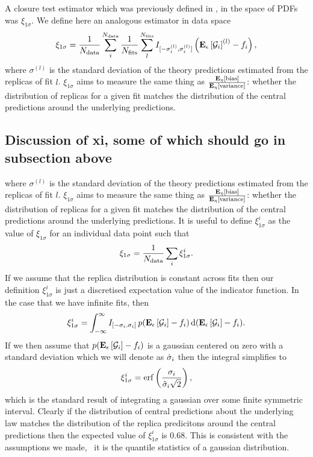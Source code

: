 A closure test estimator which was previously defined in \cite{nnpdf30}, in
the space of PDFs was
$\xi_{1\sigma}$. We define here an analogous estimator in data space
\begin{equation}
    \label{eq:XiDataDef}
    \xi_{1\sigma} = 
        \frac{1}{N_{\rm data}} \sum_{i}^{N_{\rm data}} 
        \frac{1}{N_{\rm fits}} \sum_{l}^{N_{\rm fits}}
            I_{[-\sigma_i^{(l)}, \sigma_i^{(l)}]}
            \left( \mathbf{E}_{\epsilon}\left[ \mathcal{G}_i \right]^{(l)} - f_i \right),
\end{equation}
where $\sigma^{(l)}$ is the standard deviation of the theory predictions
estimated from the replicas of fit $l$. $\xi_{1\sigma}$ aims to measure the same
thing as $\frac{\mathbf{E}_{\eta}\left[ {\rm bias} \right]}{\mathbf{E}_{\eta}\left[ {\rm variance} \right]}$: whether the distribution of
replicas for a given fit matches the distribution of the central predictions
around the underlying predictions.

\subsection{Discussion of xi, some of which should go in subsection above}

where $\sigma^{(l)}$ is the standard deviation of the theory predictions
estimated from the replicas of fit $l$. $\xi_{1\sigma}$ aims to measure the same
thing as $\frac{\mathbf{E}_{\eta}\left[ {\rm bias} \right]}{\mathbf{E}_{\eta}\left[ {\rm variance} \right]}$: whether the distribution of
replicas for a given fit matches the distribution of the central predictions
around the underlying predictions. It is useful to define $\xi_{1\sigma}^{i}$ as
the value of $\xi_{1\sigma}$ for an individual data point such that
\begin{equation}
    \label{eq:XiDataIDel}
    \xi_{1\sigma} = \frac{1}{N_{\rm data}} \sum_i \xi_{1\sigma}^{i}.
\end{equation}
If we assume that the replica distribution is constant across fits then our
definition $\xi_{1\sigma}^{i}$ is just a discretised expectation value of the
indicator function. In the case that we have infinite fits, then
\begin{equation}
    \label{eq:XiIExpecVel}
    \xi_{1\sigma}^{i} = 
    \int_{-\infty}^{\infty} I_{[-\sigma_i, \sigma_i]}\, 
    p(\mathbf{E}_{\epsilon}\left[ \mathcal{G}_i \right] - f_i)\, 
    {\rm d}(\mathbf{E}_{\epsilon}\left[ \mathcal{G}_i \right] - f_i).
\end{equation}
If we then assume that $p(\mathbf{E}_{\epsilon}\left[ \mathcal{G}_i \right] - f_i)$ is a gaussian centered on
zero with a standard deviation which we will denote as $\hat{\sigma}_i$ then the
integral simplifies to
\begin{equation}
    \label{eq:expectedxi}
    \xi_{1\sigma}^{i} = 
    {\rm erf} \left( \frac{\sigma_i}{\hat{\sigma}_i \sqrt{2}}\right),
\end{equation}
which is the standard result of integrating a gaussian over some finite
symmetric interval. Clearly if the distribution of central predictions about the
underlying law matches the distribution of the replica predicitons around the
central predictions then the expected value of $\xi_{1\sigma}^{i}$ is 0.68. This
is consistent with the assumptions we made, \viz\ it is  the quantile statistics
of a gaussian distribution.


